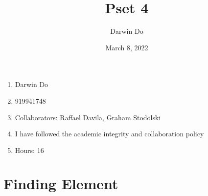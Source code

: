 \documentclass{article}
\title{Pset 4}
\begin{document}
\newcommand{\Not}{\textbf{not}}
\newcommand{\AAnd}{\textbf{and}}
\newcommand{\Or}{\textbf{or}}
\newcommand{\True}{\texttt{True}}
\newcommand{\False}{\texttt{False}}

\date{March 8, 2022 }
\author{Darwin Do}

\maketitle

\begin{enumerate}
    \item Darwin Do
    \item 919941748
    \item Collaborators: Raffael Davila, Graham Stodolski
    \item I have followed the academic integrity and collaboration policy
    \item Hours: 16
\end{enumerate}

\newpage

\section{Finding Element}
\end{document}

